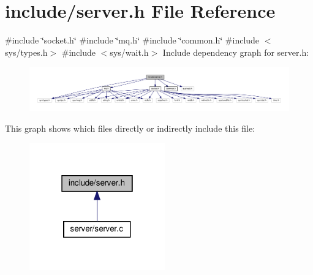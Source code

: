 \section{include/server.h File Reference}
\label{server_8h}
{\ttfamily \#include \char`\"{}socket.\+h\char`\"{}}\newline
{\ttfamily \#include \char`\"{}mq.\+h\char`\"{}}\newline
{\ttfamily \#include \char`\"{}common.\+h\char`\"{}}\newline
{\ttfamily \#include $<$sys/types.\+h$>$}\newline
{\ttfamily \#include $<$sys/wait.\+h$>$}\newline
Include dependency graph for server.\+h\+:\nopagebreak
\begin{figure}[H]
\begin{center}
\leavevmode
\includegraphics[width=350pt]{server_8h__incl}
\end{center}
\end{figure}
This graph shows which files directly or indirectly include this file\+:\nopagebreak
\begin{figure}[H]
\begin{center}
\leavevmode
\includegraphics[width=166pt]{server_8h__dep__incl}
\end{center}
\end{figure}
